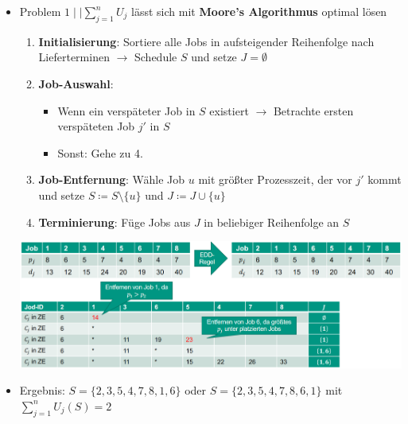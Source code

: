 \begin{itemize}
	\item Problem $1\mid\mid \sum\limits_{j=1}^{n} U_j$ lässt sich mit \textbf{Moore's Algorithmus} optimal lösen
	\begin{enumerate}
		\item \textbf{Initialisierung}: Sortiere alle Jobs in aufsteigender Reihenfolge nach Lieferterminen $\rightarrow$ Schedule $S$ und setze $J=\emptyset$
		\item \textbf{Job-Auswahl}: 
		\begin{itemize}
			\item Wenn ein verspäteter Job in $S$ existiert $\rightarrow$ Betrachte ersten verspäteten Job $j'$ in $S$ 
			\item Sonst: Gehe zu 4.
		\end{itemize}
		\item \textbf{Job-Entfernung}: Wähle Job $u$ mit größter Prozesszeit, der vor $j'$ kommt und setze $S\coloneqq S\setminus\{u\}$ und $J\coloneqq J\cup \{u\}$
		\item \textbf{Terminierung}: Füge Jobs aus $J$ in beliebiger Reihenfolge an $S$
	\end{enumerate}
	\smallskip
	\begin{center}
		\includegraphics[width=\textwidth]{images/moore.png}
	\end{center}
	\item Ergebnis: $S=\{2,3,5,4,7,8,1,6\}$ oder $S=\{2,3,5,4,7,8,6,1\}$ mit $\sum\limits_{j=1}^{n} U_j(S)=2$
\end{itemize}

